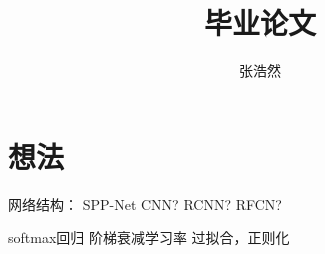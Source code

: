 \documentclass{article}
\title{毕业论文}
\author{张浩然}
\date{}
\begin{document}

\maketitle

\section{想法}
网络结构：
    SPP-Net
    CNN?
    RCNN?
    RFCN?

softmax回归
阶梯衰减学习率
过拟合，正则化


\cite{name1}


\end{document}

